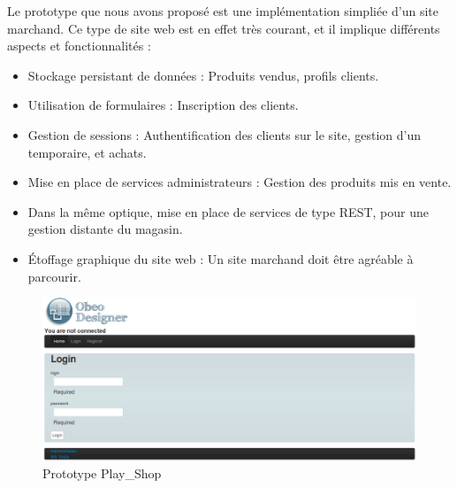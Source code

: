 Le prototype que nous avons proposé est une implémentation simpliée d'un site marchand. Ce type de site web est en effet très courant, et il implique différents aspects et fonctionnalités : 
\begin{itemize}
\item Stockage persistant de données : Produits vendus, profils clients.
\item Utilisation de formulaires : Inscription des clients.
\item Gestion de sessions : Authentification des clients sur le site, gestion d'un  temporaire, et achats.
\item Mise en place de services administrateurs : Gestion des produits mis en vente.
\item Dans la même optique, mise en place de services de type REST, pour une gestion distante du magasin.
\item Étoffage graphique du site web : Un site marchand doit être agréable à parcourir.
\end{itemize}

\begin{figure}[htb]
  \centering
  \includegraphics[scale=.4]{img/proto.eps}
  \caption{Prototype Play\_Shop}
  \label{fig:pro}
\end{figure}





